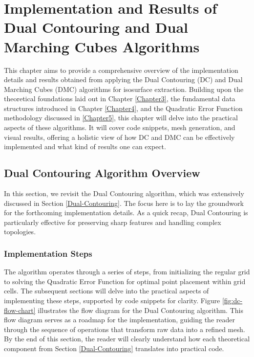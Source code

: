 \chapter{Implementation and Results of Dual Contouring and Dual Marching Cubes Algorithms} \label{Chapter6}

This chapter aims to provide a comprehensive overview of the implementation details and results obtained from applying the Dual Contouring (DC) and Dual Marching Cubes (DMC) algorithms for isosurface extraction. Building upon the theoretical foundations laid out in Chapter \ref{Chapter3}, the fundamental data structures introduced in Chapter \ref{Chapter4}, and the Quadratic Error Function methodology discussed in \ref{Chapter5}, this chapter will delve into the practical aspects of these algorithms. It will cover code snippets, mesh generation, and visual results, offering a holistic view of how DC and DMC can be effectively implemented and what kind of results one can expect.

\section{Dual Contouring Algorithm Overview}
In this section, we revisit the Dual Contouring algorithm, which was extensively discussed in Section \ref{Dual-Contouring}. The focus here is to lay the groundwork for the forthcoming implementation details. As a quick recap, Dual Contouring is particularly effective for preserving sharp features and handling complex topologies. 

\subsection{Implementation Steps}

The algorithm operates through a series of steps, from initializing the regular grid to solving the Quadratic Error Function for optimal point placement within grid cells. The subsequent sections will delve into the practical aspects of implementing these steps, supported by code snippets for clarity. Figure \ref{fig:dc-flow-chart} illustrates the flow diagram for the Dual Contouring algorithm. This flow diagram serves as a roadmap for the implementation, guiding the reader through the sequence of operations that transform raw data into a refined mesh. By the end of this section, the reader will clearly understand how each theoretical component from Section \ref{Dual-Contouring} translates into practical code.

